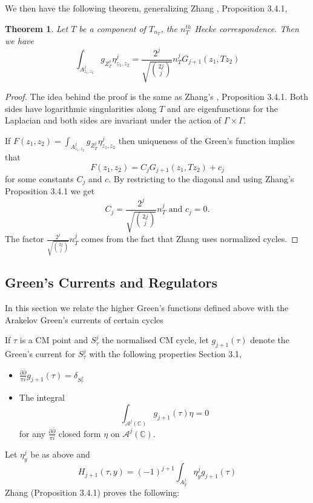 \documentclass[11pt,a4paper]{article}
\newtheorem{thm}[defn]{Theorem}
\newcommand {\C}{{\mathds C}}
\newcommand {\A}{{\mathcal A}}
\begin{document}
We then have the following theorem, generalizing Zhang \cite{zhan}, Proposition 3.4.1,
	
	\begin{thm} Let $T$ be a component of $T_{n_T}$, the $n_T^{th}$ Hecke correspondence. Then we have 
		$$\int_{A^j_{z_1,z_2}} g_{Z^j_T} \eta^j_{z_1,z_2} = \frac{2^j}{\sqrt{\binom{2j}{j}}} n^j_T G_{j+1}(z_1,T z_2)$$
% 


	\label{newgreen}
	\end{thm}

\begin{proof} 
	
	The idea behind the proof is the same as Zhang's \cite{zhan}, Proposition 3.4.1. Both sides have logarithmic singularities along $T$ and are eigenfunctions for the Laplacian and both sides are invariant under the action of $\Gamma \times \Gamma$. 
	
	If $F(z_1,z_2)=\int_{A^j_{z_1,z_2}} g_{Z^j_T} \eta^j_{z_1,z_2} $ then uniqueness of the Green's function implies that 
	$$F(z_1,z_2)=C_j G_{j+1}(z_1,Tz_2)+c_j$$ 
	for some constants $C_j$ and $c$. By restricting to the diagonal and using Zhang's Proposition 3.4.1 we get
    $$C_j=\frac{2^j}{\sqrt{\binom{2j}{j}}} n^j_T \text{ and } c_j=0.$$ 
	The factor $\frac{2^j}{\sqrt{\binom{2j}{j}}}n^j_T$ comes from the fact that Zhang uses normalized cycles. 
\end{proof}
 
 
 \iffalse



\subsection{Green's Currents and Regulators}

In this section we relate the higher Green's functions defined above with the  Arakelov Green's currents of certain cycles 



\label{greensandregulators}

If $\tau$ is a CM point and $S^j_{\tau}$ the normalised CM cycle, let $g_{j+1}(\tau)$ denote the Green's current for $S^j_{\tau}$ with the following properties \cite{zhan} Section 3.1,

\begin{itemize}
	
	\item $\frac{\partial \bar{\partial}}{\pi i} g_{j+1}(\tau) = \delta_{S^j_{\tau}}$
	\item The integral 
	$$\int_{\A^j(\C)} g_{j+1}(\tau) \eta=0$$
	for any $\frac{\partial \bar{\partial}}{\pi i}$ closed form $\eta$ on $\A^j(\C)$.
\end{itemize}
%
Let $\eta^j_y$ be as above and 
%
$$H_{j+1}(\tau,y)=(-1)^{j+1} \int_{A^j_y} \eta^j_y g_{j+1}(\tau)$$
%
Zhang \cite{zhan}(Proposition 3.4.1) proves the following:
\end{document}
